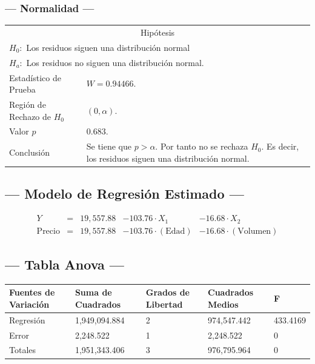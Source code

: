 \subsubsection{--- Normalidad ---} %
\begin{center}
  \begin{tabular}{|l|p{8cm}|}
    \cline{1-2}
    \multicolumn{2}{|c|}{Hipótesis}\\ \cline{1-2}
    \multicolumn{2}{|l|}{\(H_0:\) Los residuos siguen una distribución normal} \\ 
    \multicolumn{2}{|l|}{\(H_a:\) Los residuos no siguen una distribución normal.} \\ \cline{1-2}
    Estadístico de Prueba & \(W = 0.94466\).\\ \cline{1-2} 
		Región de Rechazo de \(H_0\) & \((0, \alpha )\).\\ \cline{1-2} 
    Valor \(p\) & \(0.683\).\\ \cline{1-2} 
    Conclusión & Se tiene que \(p> \alpha\). \newline 
		Por tanto no se rechaza \(H_0\). \newline 
		Es decir, los residuos siguen una distribución normal.\\ \cline{1-2} 
  \end{tabular}
\end{center}


\subsection{\centering --- Modelo de Regresión Estimado ---} %
\begin{align}
	Y & = &              19,557.88  & -103.76 \cdot X_1           & - 16.68 \cdot X_2   \\[2mm]
	\mbox{Precio} & = &  19,557.88 &  -103.76 \cdot (\mbox{Edad}) & - 16.68 \cdot (\mbox{Volumen})
	\label{eq:1}
\end{align}

\subsection{\centering --- Tabla Anova ---} %
\begin{center}
  \begin{tabular}{|l|l|l|l|l|}
    \hline 
    Fuentes de Variación  & Suma de Cuadrados & Grados de Libertad & Cuadrados Medios & F\\ \hline 
		Regresión & 1,949,094.884 & 2 & 974,547.442 & 433.4169 \\ \hline
		Error     &     2,248.522 & 1 &   2,248.522 &   0 \\ \hline
		Totales   & 1,951,343.406 & 3 & 976,795.964 &   0 \\ \hline
  \end{tabular}
\end{center} 

